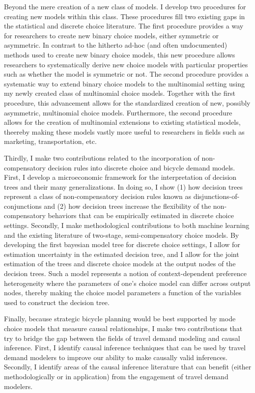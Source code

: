 Beyond the mere creation of a new class of models. I develop two procedures for creating new models within this class. These procedures fill two existing gaps in the statistical and discrete choice literature. The first procedure provides a way for researchers to create new binary choice models, either symmetric or asymmetric. In contrast to the hitherto ad-hoc (and often undocumented) methods used to create new binary choice models, this new procedure allows researchers to systematically derive new choice models with particular properties such as whether the model is symmetric or not. The second procedure provides a systematic way to extend binary choice models to the multinomial setting using my newly created class of multinomial choice models. Together with the first procedure, this advancement allows for the standardized creation of new, possibly asymmetric, multinomial choice models. Furthermore, the second procedure allows for the creation of multinomial extensions to existing statistical models, theereby making these models vastly more useful to researchers in fields such as marketing, transportation, etc.

Thirdly, I make two contributions related to the incorporation of non-compensatory decision rules into discrete choice and bicycle demand models. First, I develop a microeconomic framework for the interpretation of decision trees and their many generalizations. In doing so, I show (1) how decision trees represent a class of non-compensatory decision rules known as disjunctions-of-conjunctions and (2) how decision trees increase the flexibility of the non-compensatory behaviors that can be empirically estimated in discrete choice settings. Secondly, I make methodological contributions to both machine learning and the existing literature of two-stage, semi-compensatory choice models. By developing the first bayesian model tree for discrete choice settings, I allow for estimation uncertainty in the estimated decision tree, and I allow for the joint estimation of the trees and discrete choice models at the output nodes of the decision trees. Such a model represents a notion of context-dependent preference heterogeneity where the parameters of one's choice model can differ across output nodes, thereby making the choice model parameters a function of the variables used to construct the decision tree.

Finally, because strategic bicycle planning would be best supported by mode choice models that measure causal relationships, I make two contributions that try to bridge the gap between the fields of travel demand modeling and causal inference. First, I identify causal inference techniques that can be used by travel demand modelers to improve our ability to make causally valid inferences. Secondly, I identify areas of the causal inference literature that can benefit (either methodologically or in application) from the engagement of travel demand modelers.

